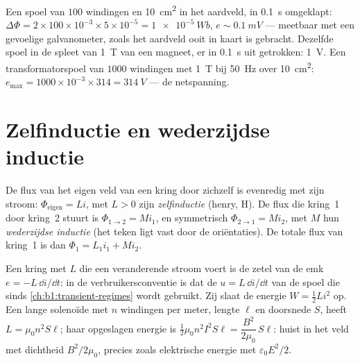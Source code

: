 \begin{example}\label{ex:b1:induction:orders}
Een spoel van $100$ windingen en \qty{10}{cm^2} in het aardveld, in
\qty{0.1}{s} omgeklapt: $\Delta\Phi = 2 \times 100 \times 10^{-3} \times 5 \times 10^{-5} = \qty{1e-5}{Wb}$,
$e \sim \qty{0.1}{mV}$ --- meetbaar met een gevoelige galvanometer, zoals
het aardveld ooit in kaart is gebracht. Dezelfde spoel in de spleet van \qty{1}{T}
van een magneet, er in \qty{0.1}{s} uit getrokken: \qty{1}{V}. Een transformatorspoel van
$1000$ windingen met \qty{1}{T} bij \qty{50}{Hz} over \qty{10}{cm^2}: $e_{\max} =
1000 \times 10^{-3} \times 314 = \qty{314}{V}$ --- de netspanning.
\end{example}

\section{Zelfinductie en wederzijdse inductie}

\begin{definition}[Inductie]\label{def:b1:induction:inductance}
De flux van het eigen veld van een kring door zichzelf is evenredig met zijn
stroom: $\Phi_{\text{eigen}} = Li$, met $L > 0$ zijn \emph{zelfinductie}
(henry, \unit{H}). De flux die kring~1 door kring~2 stuurt is
$\Phi_{1 \to 2} = Mi_1$, en symmetrisch $\Phi_{2 \to 1} = Mi_2$, met $M$
hun \emph{wederzijdse inductie} (het teken ligt vast door de oriëntaties). De
totale flux van kring~1 is dan $\Phi_1 = L_1i_1 + Mi_2$.
\end{definition}

\begin{proposition}\label{prop:b1:induction:inductor}
Een kring met  $L$ die een veranderende stroom voert is de zetel van
de emk $e = -L\,\dd i/\dd t$: in de verbruikersconventie is dat de
 $u = L\,\dd i/\dd t$ van de spoel die sinds
\cref{ch:b1:transient-regimes} wordt gebruikt. Zij slaat de energie $W = \tfrac12Li^2$ op.
Een lange solenoïde met $n$ windingen per meter, lengte $\ell$ en doorsnede $S$,
heeft $L = \mu_0n^2S\ell$; haar opgeslagen energie is $\tfrac12\mu_0n^2I^2S\ell =
\dfrac{B^2}{2\mu_0}\,S\ell$:  huist in het veld met
dichtheid $B^2/2\mu_0$, precies zoals elektrische energie met $\varepsilon_0E^2/2$.
\end{proposition}

